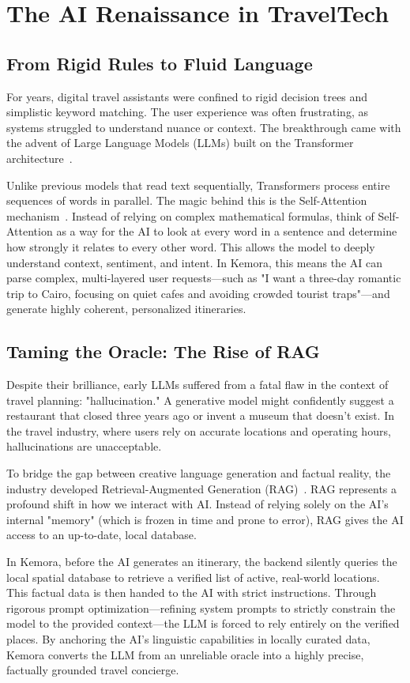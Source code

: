\section{The AI Renaissance in TravelTech}
\subsection{From Rigid Rules to Fluid Language}
For years, digital travel assistants were confined to rigid decision trees and simplistic keyword matching. The user experience was often frustrating, as systems struggled to understand nuance or context. The breakthrough came with the advent of Large Language Models (LLMs) built on the Transformer architecture~\cite{vaswani2017attention}.

Unlike previous models that read text sequentially, Transformers process entire sequences of words in parallel. The magic behind this is the Self-Attention mechanism~\cite{vaswani2017attention}. Instead of relying on complex mathematical formulas, think of Self-Attention as a way for the AI to look at every word in a sentence and determine how strongly it relates to every other word. This allows the model to deeply understand context, sentiment, and intent. In Kemora, this means the AI can parse complex, multi-layered user requests—such as "I want a three-day romantic trip to Cairo, focusing on quiet cafes and avoiding crowded tourist traps"—and generate highly coherent, personalized itineraries.

\subsection{Taming the Oracle: The Rise of RAG}
Despite their brilliance, early LLMs suffered from a fatal flaw in the context of travel planning: "hallucination." A generative model might confidently suggest a restaurant that closed three years ago or invent a museum that doesn't exist. In the travel industry, where users rely on accurate locations and operating hours, hallucinations are unacceptable.

To bridge the gap between creative language generation and factual reality, the industry developed Retrieval-Augmented Generation (RAG)~\cite{lewis2020rag}. RAG represents a profound shift in how we interact with AI. Instead of relying solely on the AI's internal "memory" (which is frozen in time and prone to error), RAG gives the AI access to an up-to-date, local database. 

In Kemora, before the AI generates an itinerary, the backend silently queries the local spatial database to retrieve a verified list of active, real-world locations. This factual data is then handed to the AI with strict instructions. Through rigorous prompt optimization—refining system prompts to strictly constrain the model to the provided context—the LLM is forced to rely entirely on the verified places. By anchoring the AI's linguistic capabilities in locally curated data, Kemora converts the LLM from an unreliable oracle into a highly precise, factually grounded travel concierge.

